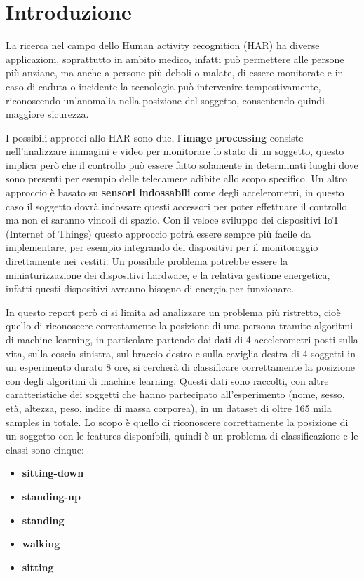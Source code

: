 \section{Introduzione}\label{sec:introduzione}
La ricerca nel campo dello Human activity recognition (HAR) ha diverse applicazioni, soprattutto in ambito medico, infatti può permettere alle persone più anziane, ma anche a persone più deboli o malate, di essere monitorate e in caso di caduta o incidente la tecnologia può intervenire tempestivamente, riconoscendo un'anomalia nella posizione del soggetto, consentendo quindi maggiore sicurezza.  

I possibili approcci allo HAR sono due, l'\textbf{image processing} consiste nell'analizzare immagini e video per monitorare lo stato di un soggetto, questo implica però che il controllo può essere fatto solamente in determinati luoghi dove sono presenti per esempio delle telecamere adibite allo scopo specifico. Un altro approccio è basato su \textbf{sensori indossabili} come degli accelerometri, in questo caso il soggetto dovrà indossare questi accessori per poter effettuare il controllo ma non ci saranno vincoli di spazio.  Con il veloce sviluppo dei dispositivi IoT (Internet of Things) questo approccio potrà essere sempre più facile da implementare, per esempio integrando dei dispositivi per il monitoraggio direttamente nei vestiti. Un possibile problema potrebbe essere la miniaturizzazione dei dispositivi hardware, e la relativa gestione energetica, infatti questi dispositivi avranno bisogno di energia per funzionare.

In questo report però ci si limita ad analizzare un problema più ristretto, cioè quello di riconoscere correttamente la posizione di una persona tramite algoritmi di machine learning, in particolare partendo dai dati di 4 accelerometri posti sulla vita, sulla coscia sinistra, sul braccio destro e sulla caviglia destra di 4 soggetti in un esperimento durato 8 ore, si cercherà di classificare correttamente la posizione con degli algoritmi di machine learning. Questi dati sono raccolti, con altre caratteristiche dei soggetti che hanno partecipato all'esperimento (nome, sesso, età, altezza, peso, indice di massa corporea), in un dataset di oltre 165 mila samples in totale. Lo scopo è quello di riconoscere correttamente la posizione di un soggetto con le features disponibili, quindi è un problema di classificazione e le classi sono cinque:
\begin{itemize}
\item \textbf{sitting-down}
\item \textbf{standing-up}
\item \textbf{standing}
\item \textbf{walking}
\item \textbf{sitting}
\end{itemize}

